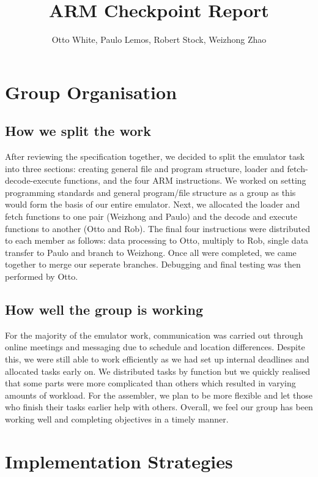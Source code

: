 \documentclass[11pt]{article}
\begin{document}
  \title{ARM Checkpoint Report}
  \author{Otto White, Paulo Lemos, Robert Stock, Weizhong Zhao}

  \maketitle

  \section*{Group Organisation}

  \subsection*{How we split the work}

After reviewing the specification together, we decided to split the emulator task into three  sections: creating general file and program structure, loader and fetch-decode-execute functions, and the four ARM instructions. We worked on setting programming standards and general program/file structure as a group as this would form the basis of our entire emulator. Next, we allocated the loader and fetch functions to one pair (Weizhong and Paulo) and the decode and execute functions to another (Otto and Rob). The final four instructions were distributed to each member as follows: data processing to Otto, multiply to Rob, single data transfer to Paulo and branch to Weizhong. Once all were completed, we came together to merge our seperate branches. Debugging and final testing was then performed by Otto.

  \subsection*{How well the group is working}

For the majority of the emulator work, communication was carried out through online meetings and messaging due to schedule and location differences. Despite this, we were still able to work efficiently as we had set up internal deadlines and allocated tasks early on. We distributed tasks by function but we quickly realised that some parts were more complicated than others which resulted in varying amounts of workload. For the assembler, we plan to be more flexible and let those who finish their tasks earlier help with others. Overall, we feel our group has been working well and completing objectives in a timely manner.

  \section*{Implementation Strategies}
\end{document}
